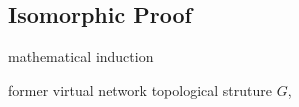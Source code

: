 \subsection{Isomorphic Proof}
mathematical induction

former virtual network topological struture $G$,